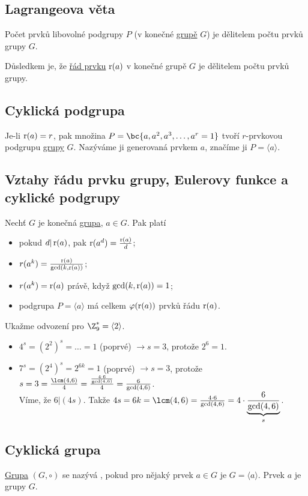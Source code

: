 \subsection{Lagrangeova věta}\label{lagrange}
Počet prvků libovolné podgrupy $P$ (v konečné \hyperref[grupa]{grupě} $G$) je dělitelem počtu prvků grupy $G$.

Důsledkem je, že \hyperref[radPrvku]{řád prvku} $\operatorname*{r}(a)$ v konečné grupě $G$ je dělitelem počtu prvků grupy.

\subsection{Cyklická podgrupa}
Je-li $\operatorname*{r}(a) = r$, pak množina $P = \bc{a, a^2, a^3, \dots, a^r = 1}$ tvoří $r$-prvkovou podgrupu \hyperref[grupa]{grupy} $G$. Nazýváme ji  generovaná prvkem $a$, značíme ji $P = \langle a \rangle$.

\subsection{Vztahy řádu prvku grupy, Eulerovy funkce a cyklické podgrupy}
Nechť $G$ je konečná \hyperref[grupa]{grupa}, $a \in G$. Pak platí
\vspace{-1em}
\begin{itemize}
	\item pokud $d | \operatorname*{r}(a)$, pak $\operatorname*{r}(a^d) = \frac{\operatorname*{r}(a)}{d}$;
	\item $r(a^k) = \frac{\operatorname*{r}(a)}{\gcd(k, \operatorname*{r}(a))}$;
	\item $r(a^k) = \operatorname*{r}(a)$ právě, když $\gcd(k, \operatorname*{r}(a)) = 1$;
	\item podgrupa $P = \langle a \rangle$ má celkem $\varphi(\operatorname*{r}(a))$ prvků řádu $\operatorname*{r}(a)$.
\end{itemize}
Ukažme odvození pro $\Z_9^* = \langle 2 \rangle$.
\begin{itemize}
	\item $4^s = (2^2)^s = \dots = 1$ (poprvé) $\rightarrow s=3$, protože $2^6 = 1$.
	\item $7^s = (2^4)^s = 2^{6k} = 1$ (poprvé) $\rightarrow s=3$, protože $s = 3 = \frac{\lcm(4,6)}{4} = \frac{\frac{4 \cdot 6}{\gcd(4,6)}}{4}= \frac{6}{\gcd(4,6)}$.\\
	Víme, že $6 | (4s)$. Takže $4s = 6k = \lcm(4,6) = \frac{4 \cdot 6}{\gcd(4,6)} = 4 \cdot \underbrace{\frac{6}{\gcd(4,6)}}_{s}$.
\end{itemize}

\subsection{Cyklická grupa}\label{cyklGrupa}\label{generator}
\hyperref[grupa]{Grupa} $(G, \circ)$ se nazývá , pokud pro nějaký prvek $a \in G$ je $G = \langle a \rangle$. Prvek $a$ je  grupy $G$.

